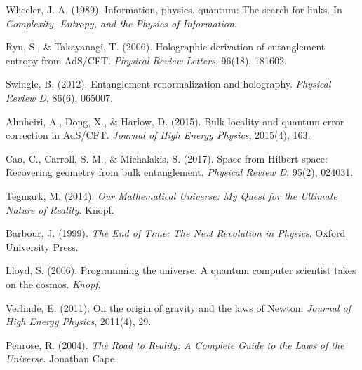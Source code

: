 \documentclass[12pt]{article}
\begin{document}
\begin{thebibliography}{99}

 Wheeler, J. A. (1989). Information, physics, quantum: The search for links. In \emph{Complexity, Entropy, and the Physics of Information}.

 Ryu, S., \& Takayanagi, T. (2006). Holographic derivation of entanglement entropy from AdS/CFT. \emph{Physical Review Letters}, 96(18), 181602.

 Swingle, B. (2012). Entanglement renormalization and holography. \emph{Physical Review D}, 86(6), 065007.

 Almheiri, A., Dong, X., \& Harlow, D. (2015). Bulk locality and quantum error correction in AdS/CFT. \emph{Journal of High Energy Physics}, 2015(4), 163.

 Cao, C., Carroll, S. M., \& Michalakis, S. (2017). Space from Hilbert space: Recovering geometry from bulk entanglement. \emph{Physical Review D}, 95(2), 024031.

 Tegmark, M. (2014). \emph{Our Mathematical Universe: My Quest for the Ultimate Nature of Reality}. Knopf.

 Barbour, J. (1999). \emph{The End of Time: The Next Revolution in Physics}. Oxford University Press.

 Lloyd, S. (2006). Programming the universe: A quantum computer scientist takes on the cosmos. \emph{Knopf}.

 Verlinde, E. (2011). On the origin of gravity and the laws of Newton. \emph{Journal of High Energy Physics}, 2011(4), 29.

 Penrose, R. (2004). \emph{The Road to Reality: A Complete Guide to the Laws of the Universe}. Jonathan Cape.

\end{thebibliography}
\end{document}
